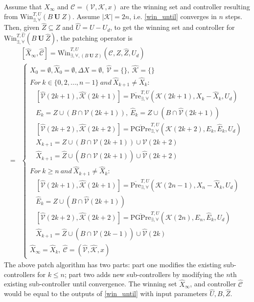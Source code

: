 Assume that $ X_\infty $ and $ \mathcal{C}=(\mathcal{V},\mathcal{K},x) $ are the winning set and controller resulting from $ \text{Win}_{\exists,\forall}^{T,U}(B\mathbf{\ U\ }Z) $. Assume $ \vert \mathcal{K}\vert = 2n $, i.e. \eqref{win_until} converges in $ n $ steps. Then, given $ \widehat{Z}\subseteq Z $ and $ \widehat{U}= U-U_d $, to get the winning set and controller for $ \text{Win}_{\exists,\forall}^{T,\widehat{U}}(B\mathbf{\ U\ }\widehat{Z}) $, the patching operator is
\begin{align}
&[\widehat{X}_\infty, \widehat{\mathcal{C}}]=\overline{\text{Win}}^{T, U}_{\exists,\forall, (B\mathbf{\ U\ }Z)}(\mathcal{C},Z,\widehat{Z}, U_d)\\
=&\begin{cases}
X_0 = \emptyset, \widehat{X}_0 = \emptyset, \Delta X = \emptyset, \ \widehat{\mathcal{V}}=\{\},\ \widehat{\mathcal{K}}=\{\}\\
For ~ k\in \{0,2,...,n-1\}\ and\ \widehat{X}_{k+1}\not=\widehat{X}_k:\\
\ \ \ \ [\widehat{\mathcal{V}}(2k+1),\widehat{\mathcal{K}}(2k+1)] = \overline{\text{Pre}}_{\exists,\forall}^{T,U}(\mathcal{K}(2k+1),X_{k}-\widehat{X}_{k}, U_d)\\
\ \ \ \ E_k = Z\cup (B\cap \mathcal{V}(2k+1)),\ \widehat{E}_k =  Z\cup (B\cap \widehat{\mathcal{V}}(2k+1))\\
\ \ \ \ [\widehat{\mathcal{V}}(2k+2),\widehat{\mathcal{K}}(2k+2)] = \overline{\text{PGPre}}_{\exists,\forall}^{T,U}(\mathcal{K}(2k+2),E_k, \widehat{E}_k,U_d)\\ 
\ \ \ \ X_{k+1} = Z\cup (B\cap \mathcal{V}(2k+1)) \cup \mathcal{V}(2k+2)\\
\ \ \ \ \widehat{X}_{k+1} =\widehat{Z}\cup (B\cap \widehat{\mathcal{V}}(2k+1)) \cup \widehat{\mathcal{V}}(2k+2)\\
For~k\geq n\ and\ \widehat{X}_{k+1}\not=\widehat{X}_k:	\\
\ \ \ \ [\widehat{\mathcal{V}}(2k+1),\widehat{\mathcal{K}}(2k+1)] = \overline{\text{Pre}}_{\exists,\forall}^{T,U}(\mathcal{K}(2n-1),X_{n}-\widehat{X}_{k}, U_d)\\
\ \ \ \ \widehat{E}_k =  Z\cup (B\cap \widehat{\mathcal{V}}(2k+1))\\
\ \ \ \ [\widehat{\mathcal{V}}(2k+2),\widehat{\mathcal{K}}(2k+2)] = \overline{\text{PGPre}}_{\exists,\forall}^{T,U}(\mathcal{K}(2n),E_n, \widehat{E}_k,U_d)\\
\ \ \ \ \widehat{X}_{k+1} =\widehat{Z}\cup (B\cap \widehat{\mathcal{V}}(2k-1)) \cup \widehat{\mathcal{V}}(2k)\\
\widehat{X}_\infty = \widehat{X}_k,\ \widehat{\mathcal{C}} = (\widehat{\mathcal{V}},\widehat{\mathcal{K}},x)
\end{cases} \label{patch_until}
\end{align}
The above patch algorithm has two parts: part one modifies the existing sub-controllers for $ k\leq n $; part two adds new sub-controllers by modifying the $ n $th existing sub-controller until convergence. The winning set $ \widehat{X}_{\infty} $, and controller $ \widehat{\mathcal{C}} $ would be equal to the outputs of \eqref{win_until} with input parameters $ \widehat{U},B,\widehat{Z} $. 

